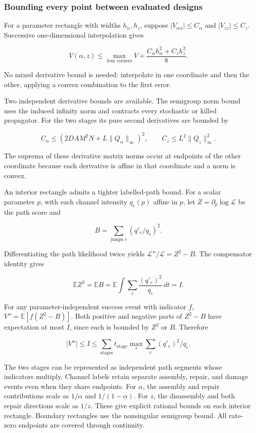 \documentclass[
  11pt,
]{article}
\begin{document}
\subsubsection{Bounding every point between evaluated
designs}\label{bounding-every-point-between-evaluated-designs}

For a parameter rectangle with widths \(h_\alpha,h_z\), suppose
\(|V_{\alpha\alpha}|\le C_\alpha\) and \(|V_{zz}|\le C_z\). Successive
one-dimensional interpolation gives

\[
V(\alpha,z)\le\max_{\text{four corners}}V
+\frac{C_\alpha h_\alpha^2+C_z h_z^2}{8}.
\]

No mixed derivative bound is needed: interpolate in one coordinate and
then the other, applying a convex combination to the first error.

Two independent derivative bounds are available. The semigroup norm
bound uses the induced infinity norm and contracts every stochastic or
killed propagator. For the two stages its pure second derivatives are
bounded by

\[
C_\alpha\le(2DA M^2N+L\|Q_\alpha\|_\infty)^2,
\qquad C_z\le L^2\|Q_z\|_\infty^2.
\]

The suprema of these derivative matrix norms occur at endpoints of the
other coordinate because each derivative is affine in that coordinate
and a norm is convex.

An interior rectangle admits a tighter labelled-path bound. For a scalar
parameter \(p\), with each channel intensity \(q_e(p)\) affine in \(p\),
let \(Z=\partial_p\log\mathcal L\) be the path score and

\[
B=\sum_{\text{jumps }e}(q'_e/q_e)^2.
\]

Differentiating the path likelihood twice yields
\(\mathcal L''/\mathcal L=Z^2-B\). The compensator identity gives

\[
\mathbb EZ^2=\mathbb EB
=\mathbb E\int\sum_e\frac{(q'_e)^2}{q_e}\,dt=I.
\]

For any parameter-independent success event with indicator \(f\),
\(V''=\mathbb E[f(Z^2-B)]\). Both positive and negative parts of
\(Z^2-B\) have expectation at most \(I\), since each is bounded by
\(Z^2\) or \(B\). Therefore

\[
|V''|\le I\le\sum_{\text{stages}}t_{\text{stage}}
\max_s\sum_e(q'_e)^2/q_e.
\]

The two stages can be represented as independent path segments whose
indicators multiply. Channel labels retain separate assembly, repair,
and damage events even when they share endpoints. For \(\alpha\), the
assembly and repair contributions scale as \(1/\alpha\) and
\(1/(1-\alpha)\). For \(z\), the disassembly and both repair directions
scale as \(1/z\). These give explicit rational bounds on each interior
rectangle. Boundary rectangles use the nonsingular semigroup bound. All
rate-zero endpoints are covered through continuity.
\end{document}
